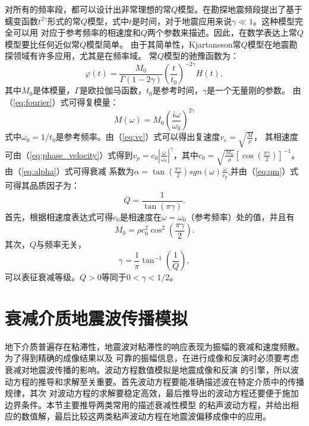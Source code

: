 对所有的频率段，都可以设计出非常理想的常$Q$模型。在勘探地震频段提出了基于
蠕变函数$t^{2\gamma}$形式的常$Q$模型，式中$t$是时间，对于地震应用来说$\gamma\ll1$。这种模型完全可以用
对应于参考频率的相速度和$Q$两个参数来描述。因此，在数学表达上常$Q$模型要比任何近似常$Q$模型简单。
由于其简单性，Kjartansson常$Q$模型在地震勘探领域有许多应用，尤其是在频率域。
常$Q$模型的驰豫函数为：
\begin{equation}
	\varphi(t)=\frac{M_0}{\Gamma(1-2\gamma)}(\frac{t}{t_0})^{-2\gamma}H(t),
\end{equation}
其中$M_0$是体模量，$\Gamma$是欧拉伽马函数，$t_0$是参考时间，$\gamma$是一个无量刚的参数。
由（\ref{eq:fourier}）式可得复模量：
\begin{equation}
	M(\omega)=M_0(\frac{i\omega}{\omega_0})^{2\gamma}
\end{equation}
式中$\omega_0=1/t_0$是参考频率。由（\ref{eq:vc}）式可以得出复速度$v_c=\sqrt{\frac{M}{\rho}}$，
其相速度可由（\ref{eq:phase_velocity}）式得到$v_p=c_0|\frac{\omega}{\omega_0}|^\gamma$，其中$c_0=
\sqrt{\frac{M_0}{\rho}}[\cos(\frac{\pi\gamma}{2})]^{-1}$。由（\ref{eq:alpha}）式可得衰减
系数为$\alpha=\tan(\frac{\pi\gamma}{2})sgn(\omega)\frac{\omega}{v_p}$,并由（\ref{eq:qm}）式
可得其品质因子为：
\begin{equation}
	Q=\frac{1}{\tan(\pi\gamma)}.
\end{equation}
首先，根据相速度表达式可得$c_0$是相速度在$\omega=\omega_0$（参考频率）处的值，并且有
\begin{equation}
	M_0=\rho c_0^2\cos^2(\frac{\pi\gamma}{2}).
\end{equation}
其次，$Q$与频率无关，
\begin{equation}
	\gamma=\frac{1}{\pi}\tan^{-1}(\frac{1}{Q}),
\end{equation}
可以表征衰减等级。$Q>0$等同于$0<\gamma<1/2$。

\vspace{0.3cm}
\section{衰减介质地震波传播模拟}
\vspace{0.3cm}

地下介质普遍存在粘滞性，地震波对粘滞性的响应表现为振幅的衰减和速度频散。为了得到精确的成像结果以及
可靠的振幅信息，在进行成像和反演时必须要考虑衰减对地震波传播的影响。波动方程数值模拟是地震成像和反演
的引擎，所以波动方程的推导和求解至关重要。首先波动方程要能准确描述波在特定介质中的传播规律，其次
对波动方程的求解要稳定高效，最后推导出的波动方程还要便于施加边界条件。本节主要推导两类常用的描述衰减性模型
的粘声波动方程，并给出相应的数值解，最后比较这两类粘声波动方程在地震波偏移成像中的应用。

